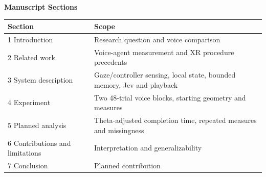 \documentclass[11pt,letterpaper]{article}
\begin{document}
{\LARGE\bfseries Manuscript Sections}\par
\begin{tabularx}{\linewidth}{@{}lX@{}}\toprule Section & Scope \\\midrule
1 Introduction & Research question and voice comparison \\
2 Related work & Voice-agent measurement and XR procedure precedents \\
3 System description & Gaze/controller sensing, local state, bounded memory, Jev and playback \\
4 Experiment & Two 48-trial voice blocks, starting geometry and measures \\
5 Planned analysis & Theta-adjusted completion time, repeated measures and missingness \\
6 Contributions and limitations & Interpretation and generalizability \\
7 Conclusion & Planned contribution \\\bottomrule\end{tabularx}
\end{document}
